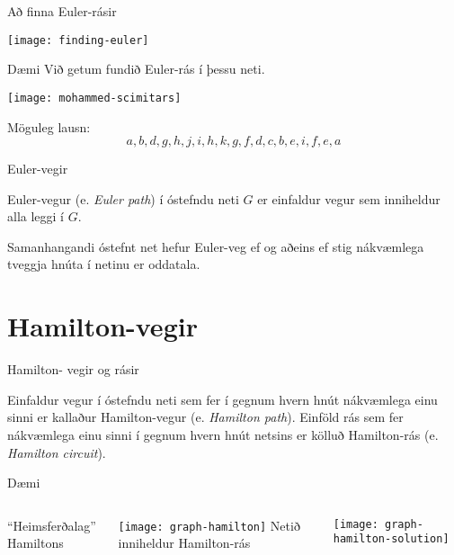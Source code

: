 \documentclass{beamer}
\begin{document}
\begin{frame}{Að finna Euler-rásir}
\begin{center}
\texttt{[image: finding-euler]}
\end{center}
\end{frame}

\begin{frame}{Dæmi}
Við getum fundið Euler-rás í þessu neti.
\begin{center}
\texttt{[image: mohammed-scimitars]}
\end{center}
\pause
Möguleg lausn:
\[
a, b, d, g, h, j, i, h, k, g, f, d, c, b, e, i, f, e, a
\]

\end{frame}

\begin{frame}{Euler-vegir}
\begin{tcolorbox}[title=Euler-vegur]
Euler-vegur (e. \emph{Euler path}) í óstefndu neti $G$ er einfaldur vegur sem inniheldur alla leggi í $G$.
\end{tcolorbox}

\begin{tcolorbox}
Samanhangandi óstefnt net hefur Euler-veg ef og aðeins ef stig nákvæmlega tveggja hnúta í netinu er oddatala.
\end{tcolorbox}
\end{frame}

\section{Hamilton-vegir}

\begin{frame}{Hamilton- vegir og rásir}
\begin{tcolorbox}[title=Hamilton-vegir og rásir]
Einfaldur vegur í óstefndu neti sem fer í gegnum hvern hnút nákvæmlega einu sinni er kallaður Hamilton-vegur (e. \emph{Hamilton path}). Einföld rás sem fer nákvæmlega einu sinni í gegnum hvern hnút netsins er kölluð Hamilton-rás (e. \emph{Hamilton circuit}).
\end{tcolorbox}
\end{frame}

\begin{frame}{Dæmi}
\begin{columns}
``Heimsferðalag'' Hamiltons

\texttt{[image: graph-hamilton]}
\pause
{}
Netið inniheldur Hamilton-rás

\texttt{[image: graph-hamilton-solution]}
\end{columns}
\end{frame}
\end{document}
